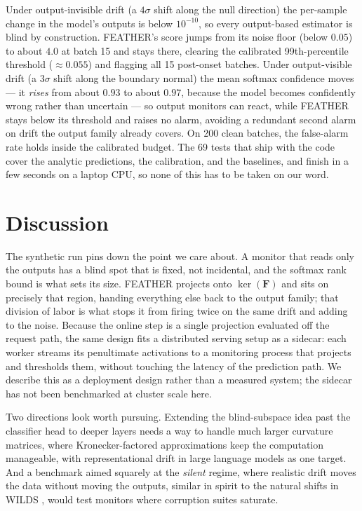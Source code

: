 \documentclass[sigconf,anonymous]{acmart}
\begin{document}
Under output-invisible drift (a $4\sigma$ shift along the null direction) the
per-sample change in the model's outputs is below $10^{-10}$, so every
output-based estimator is blind by construction. FEATHER's score jumps from
its noise floor (below $0.05$) to about $4.0$ at batch 15 and stays there,
clearing the calibrated 99th-percentile threshold ($\approx 0.055$) and
flagging all 15 post-onset batches. Under output-visible drift (a $3\sigma$
shift along the boundary normal) the mean softmax confidence moves --- it
\emph{rises} from about $0.93$ to about $0.97$, because the model becomes
confidently wrong rather than uncertain --- so output monitors can react,
while FEATHER stays below its threshold and raises no alarm, avoiding a
redundant second alarm on drift the output family already covers. On 200 clean
batches, the false-alarm rate holds inside the calibrated budget. The 69 tests
that ship with the code cover the analytic predictions, the calibration, and
the baselines, and finish in a few seconds on a laptop CPU, so none of this
has to be taken on our word.

\section{Discussion}
\label{sec:outcomes}

The synthetic run pins down the point we care about. A monitor that reads only
the outputs has a blind spot that is fixed, not incidental, and the softmax
rank bound is what sets its size. FEATHER projects onto $\ker(\mathbf{F})$ and
sits on precisely that region, handing everything else back to the output
family; that division of labor is what stops it from firing twice on the same
drift and adding to the noise. Because the online step is a single projection evaluated off
the request path, the same design fits a distributed serving setup as a
sidecar: each worker streams its penultimate activations to a monitoring
process that projects and thresholds them, without touching the latency of the
prediction path. We describe this as a deployment design rather than a
measured system; the sidecar has not been benchmarked at cluster scale here.

Two directions look worth pursuing. Extending the blind-subspace idea past the
classifier head to deeper layers needs a way to handle much larger curvature
matrices, where Kronecker-factored approximations \cite{martens2015kfac} keep
the computation manageable, with representational drift in large language
models \cite{pandey2025zdp} as one target. And a benchmark aimed squarely at
the \emph{silent} regime, where realistic drift moves the data without moving
the outputs, similar in spirit to the natural shifts in WILDS
\cite{koh2021wilds}, would test monitors where corruption suites saturate.
\end{document}
